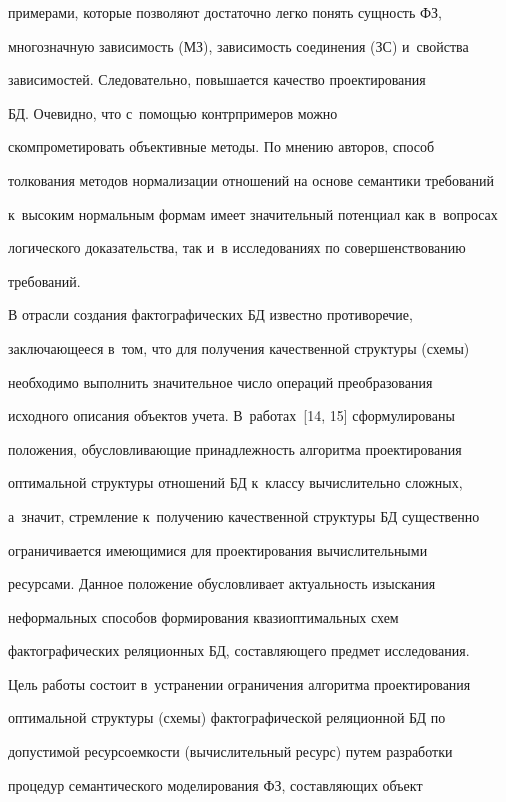 примерами, которые позволяют достаточно легко понять сущность ФЗ, 

многозначную зависимость (МЗ), зависимость соединения (ЗС) и~свойства 

зависимостей. Следовательно, повышается качество проектирования 

БД. Очевидно, что с~по\-мощью контрпримеров можно 

скомпрометировать объективные методы. По мнению авторов, способ 

толкования методов нормализации отношений на основе семантики требований 

к~высоким нормальным формам имеет значительный потенциал как в~вопросах 

логического доказательства, так и~в исследованиях по совершенствованию 

требований. 

  

  В отрасли создания фактографических БД известно противоречие, 

заключающееся в~том, что для получения качественной структуры (схемы) 

необходимо выполнить значительное число операций преобразования 

исходного описания объектов учета. В~работах~[14, 15] сформулированы 

положения, обусловливающие принадлежность алгоритма проектирования 

оптимальной структуры отношений БД к~классу вы\-чис\-ли\-тель\-но слож\-ных, 

а~значит, стремление к~получению качественной структуры БД существенно 

ограничивается име\-ющи\-ми\-ся для проектирования вычислительными 

ресурсами. Данное положение обусловливает актуальность изыска\-ния 

неформальных способов формирования квазиоптимальных схем 

фактографических реляционных БД, со\-став\-ля\-юще\-го предмет исследования.

  

  Цель работы состоит в~устранении ограничения алгоритма проектирования 

оптимальной структуры (схемы) фактографической реляционной БД по 

допустимой ре\-сур\-со\-ем\-кости (вы\-чис\-ли\-тель\-ный ресурс) путем разработки 

процедур семантического моделирования ФЗ, со\-став\-ля\-ющих объект 

